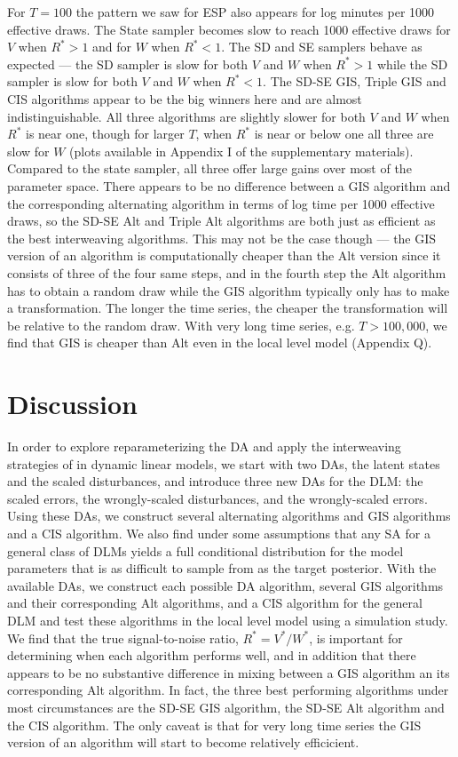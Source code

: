 \documentclass[12pt]{article}
\begin{document}
For $T=100$ the pattern we saw for ESP also appears for log minutes per 1000 effective draws. The State sampler becomes slow to reach 1000 effective draws for $V$ when $R^*>1$ and for $W$ when $R^*<1$. The SD and SE samplers behave as expected --- the SD sampler is slow for both $V$ and $W$ when $R^*>1$ while the SD sampler is slow for both $V$ and $W$ when $R^*<1$. The SD-SE GIS, Triple GIS and CIS algorithms appear to be the big winners here and are almost indistinguishable. All three algorithms are slightly slower for both $V$ and $W$ when $R^*$ is near one, though for larger $T$,  when $R^*$ is near or below one all three are slow for $W$ (plots available in Appendix I of the supplementary materials). Compared to the state sampler, all three offer large gains over most of the parameter space. There appears to be no difference between a GIS algorithm and the corresponding alternating algorithm in terms of log time per 1000 effective draws, so the SD-SE Alt and Triple Alt algorithms are both just as efficient as the best interweaving algorithms. This may not be the case though --- the GIS version of an algorithm is computationally cheaper than the Alt version since it consists of three of the four same steps, and in the fourth step the Alt algorithm has to obtain a random draw while the GIS algorithm typically only has to make a transformation. The longer the time series, the cheaper the transformation will be relative to the random draw. With very long time series, e.g. $T>100,000$, we find that GIS is cheaper than Alt even in the local level model (Appendix Q). 

\section{Discussion}\label{sec:Discuss}

In order to explore reparameterizing the DA and apply the interweaving strategies of \citet{yu2011center} in dynamic linear models, we start with two DAs, the latent states and the scaled disturbances, and introduce three new DAs for the DLM: the scaled errors, the wrongly-scaled disturbances, and the wrongly-scaled errors. Using these DAs, we construct several alternating algorithms and GIS algorithms and a CIS algorithm. We also find under some assumptions that any SA for a general class of DLMs yields a full conditional distribution for the model parameters that is as difficult to sample from as the target posterior. With the available DAs, we construct each possible DA algorithm, several GIS algorithms and their corresponding Alt algorithms, and a CIS algorithm for the general DLM and test these algorithms in the local level model using a simulation study. We find that the true signal-to-noise ratio, $R^*=V^*/W^*$, is important for determining when each algorithm performs well, and in addition that there appears to be no substantive difference in mixing between a GIS algorithm an its corresponding Alt algorithm. In fact, the three best performing algorithms under most circumstances are the SD-SE GIS algorithm, the SD-SE Alt algorithm and the CIS algorithm. The only caveat is that for very long time series the GIS version of an algorithm will start to become relatively efficicient. 
\end{document}
